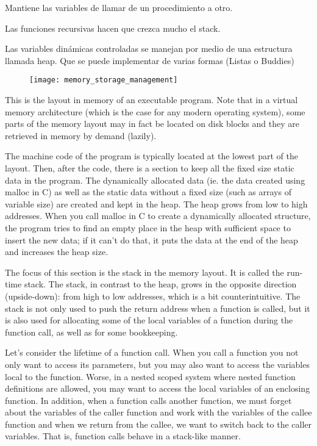 \documentclass[a4paper, twoside]{article}
\begin{document}
Mantiene las variables de llamar de un procedimiento a otro.

Las funciones recursivas hacen que crezca mucho el stack.

Las variables dinámicas controladas se manejan por medio de una estructura llamada heap. Que se puede implementar de varias formas (Listas o Buddies)

\begin{figure}[h]
	\centering
	\texttt{[image: memory\_storage\_management]}
	\label{fig:memory_storage_management}
\end{figure}

This is the layout in memory of an executable program. Note that in a virtual memory architecture (which is the case for any modern operating system), some parts of the memory layout may in fact be located on disk blocks and they are retrieved in memory by demand (lazily).

The machine code of the program is typically located at the lowest part of the layout. Then, after the code, there is a section to keep all the fixed size static data in the program. The dynamically allocated data (ie. the data created using malloc in C) as well as the static data without a fixed size (such as arrays of variable size) are created and kept in the heap. The heap grows from low to high addresses. When you call malloc in C to create a dynamically allocated structure, the program tries to find an empty place in the heap with sufficient space to insert the new data; if it can't do that, it puts the data at the end of the heap and increases the heap size.

The focus of this section is the stack in the memory layout. It is called the run-time stack. The stack, in contrast to the heap, grows in the opposite direction (upside-down): from high to low addresses, which is a bit counterintuitive. The stack is not only used to push the return address when a function is called, but it is also used for allocating some of the local variables of a function during the function call, as well as for some bookkeeping.

Let’s consider the lifetime of a function call. When you call a function you not only want to access its parameters, but you may also want to access the variables local to the function. Worse, in a nested scoped system where nested function definitions are allowed, you may want to access the local variables of an enclosing function. In addition, when a function calls another function, we must forget about the variables of the caller function and work with the variables of the callee function and when we return from the callee, we want to switch back to the caller variables. That is, function calls behave in a stack-like manner.
\end{document}
